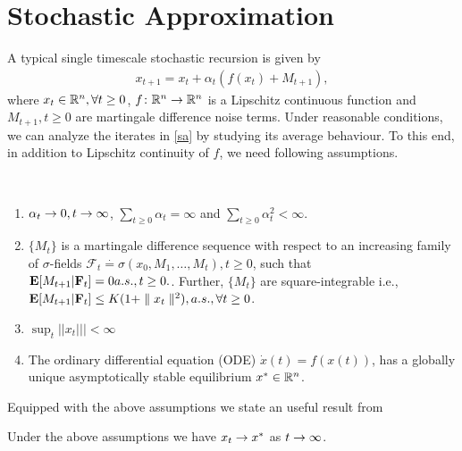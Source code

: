 \section{Stochastic Approximation}
A typical single timescale stochastic recursion is given by 
\begin{align}\label{sa}
x_{t+1}=x_t+\alpha_t(f(x_t)+M_{t+1}),
\end{align}
where $x_t\in \mathbb{R}^n, \forall t\geq 0$, $f\colon \mathbb{R}^n \rightarrow \mathbb{R}^n$ is a Lipschitz continuous function and $M_{t+1}, t\geq 0$ are martingale difference noise terms. Under reasonable conditions, we can analyze the iterates in \eqref{sa} by studying its average behaviour. To this end, in addition to Lipschitz continuity of $f$,  we need following assumptions.\par
\begin{assumption}\label{saassump}\hspace{10pt}\\
\vspace{-20pt}
\begin{enumerate}
\item $\alpha_t\rightarrow 0, t\rightarrow\infty$, $\sum_{t\geq 0}\alpha_t =\infty$ and $\sum_{t\geq 0}\alpha^2_t <\infty$.
\item $\{M_t\}$ is a martingale difference sequence with respect to an increasing family of $\sigma$-fields $\mathcal{F}_t\stackrel{\cdot}{=}\sigma(x_0,M_1,\ldots,M_t),t\geq 0$, such that
$
\mathbf{E}[M_{t+1}|\mathbf{F}_t]=0 a.s., t\geq 0.
$. Further, $\{M_t\}$ are square-integrable i.e., $\mathbf{E}[M_{t+1}|\mathbf{F}_t]\leq K(1+\parallel x_t\parallel^2), a.s., \forall t\geq 0$.
\item $\sup_t||x_t|||<\infty$
\item\label{stab} The ordinary differential equation (ODE) $\dot{x}(t)=f(x(t))$, has a globally unique asymptotically stable equilibrium $x^*\in \mathbb{R}^n$.
\end{enumerate}\end{assumption}
Equipped with the above assumptions we state an useful result from \cite{}
\begin{theorem}\label{sat}
Under the above assumptions we have $x_t\rightarrow x^*$ as $t\rightarrow\infty$. 
\end{theorem}
